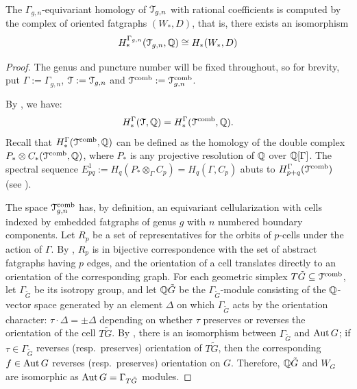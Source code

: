 \begin{theorem}\label{thm:fatgraph-homology}
  The $\Gamma_{g,n}$-equivariant homology of $\mathcal{T}_{g,n}$ with rational
  coefficients is computed by the complex of oriented fatgraphs
  $(W_*, D)$, that is, there exists an isomorphism
  \begin{equation*}
    H^{\Gamma_{g,n}}_*(\mathcal{T}_{g,n}, \mathbb{Q}) \cong H_*(W_*, D)
  \end{equation*}
\end{theorem}
\begin{proof}
  The genus and puncture number will be fixed throughout, so for
  brevity, put $\Gamma := \Gamma_{g,n}$, $\mathcal{T} := \mathcal{T}_{g,n}$ and $\mathcal{T}\sp{\text{comb}} :=
  \mathcal{T}\sp{\text{comb}}_{g,n}$.  

  By , we have:
  \begin{equation*}
    H^\Gamma_*(\mathcal{T}, \mathbb{Q}) = H^\Gamma_*(\mathcal{T}\sp{\text{comb}}, \mathbb{Q}). 
  \end{equation*}
  Recall that $H^\Gamma_*(\mathcal{T}\sp{\text{comb}}, \mathbb{Q})$ can be defined as the homology of the
  double complex $P_* \otimes C_*(\mathcal{T}\sp{\text{comb}}, \mathbb{Q})$, where $P_*$ is any projective
  resolution of $\mathbb{Q}$ over $\mathbb{Q}[\Gamma]$.  The spectral sequence $E^1_{pq} :=
  H_q(P_* \otimes_\Gamma C_p) = H_q(\Gamma, C_p)$ abuts to $H^\Gamma_{p+q}(\mathcal{T}\sp{\text{comb}})$ (see
  \cite[VII.5 and VII.7]{brown}).

  The space $\mathcal{T}\sp{\text{comb}}_{g,n}$ has, by definition, an equivariant
  cellularization with cells indexed by embedded fatgraphs of
  genus $g$ with $n$ numbered boundary components.  Let $R_p$ be a set
  of representatives for the orbits of $p$-cells under the action of
  $\Gamma$.  By , $R_p$ is in
  bijective correspondence with the set of abstract fatgraphs
  having $p$ edges, and the orientation of a cell translates directly
  to an orientation of the corresponding graph.  For each geometric
  simplex $T{\tilde G} \subseteq \mathcal{T}\sp{\text{comb}}$, let $\Gamma_{\tilde G}$ be its
  isotropy group, and let $\mathbb{Q}{\tilde G}$ be the $\Gamma_{\tilde
      G}$-module consisting of the $\mathbb{Q}$-vector space generated by an
  element $\Delta$ on which $\Gamma_{\tilde G}$ acts by the orientation
  character: $\tau \cdot \Delta = \pm \Delta$ depending on whether $\tau$ preserves or
  reverses the orientation of the cell $T{\tilde G}$.  By
  , there is an isomorphism between $\Gamma_{\tilde
      G}$ and $\operatorname{Aut} G$; if $\tau \in \Gamma_{\tilde G}$ reverses
  (resp.~preserves) orientation of $T{\tilde G}$, then the
  corresponding $f \in \operatorname{Aut} G$ reverses (resp.~preserves) orientation on
  $G$.  Therefore, $\mathbb{Q}{\tilde G}$ and $W_G$ are isomorphic as $\operatorname{Aut} G =
  \Gamma_{T{\tilde G}}$ modules.


\end{proof}
